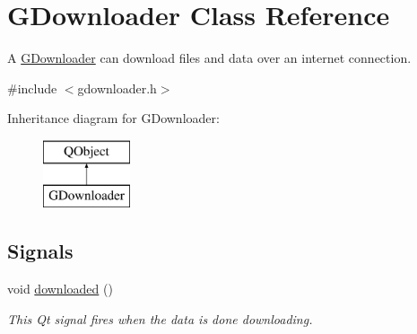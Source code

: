 \hypertarget{classsgl_1_1GDownloader}{}\section{G\+Downloader Class Reference}
\label{classsgl_1_1GDownloader}


A \mbox{\hyperlink{classsgl_1_1GDownloader}{G\+Downloader}} can download files and data over an internet connection.  




{\ttfamily \#include $<$gdownloader.\+h$>$}

Inheritance diagram for G\+Downloader\+:\begin{figure}[H]
\begin{center}
\leavevmode
\includegraphics[height=2.000000cm]{classsgl_1_1GDownloader}
\end{center}
\end{figure}
\subsection*{Signals}
\begin{DoxyCompactItemize}
\item 
void \mbox{\hyperlink{classsgl_1_1GDownloader_abb5cf1dbe464e3dc8943c261934b9a64}{downloaded}} ()
\begin{DoxyCompactList}\small\item\em This Qt signal fires when the data is done downloading. \end{DoxyCompactList}\end{DoxyCompactItemize}

